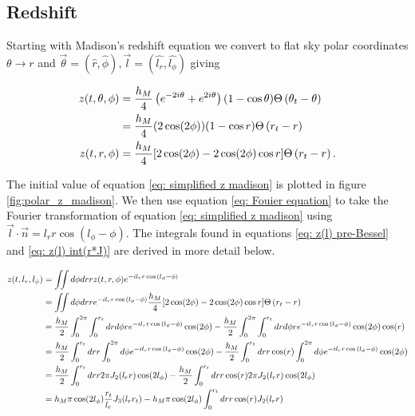 \documentclass{article}
\begin{document}
\subsection{Redshift}

Starting with Madison's redshift equation we convert to flat sky polar coordinates $\theta \rightarrow r$ and $\vec{\theta} = (\hat{r}, \hat{\phi}), \vec{l} = (\hat{l_r},  \hat{l_\phi})$ giving 

\begin{align}
    z(t, \theta, \phi) &= \frac{h_M}{4}\left(e^{-2 i \theta}+e^{2 i \theta}\right)(1-\cos \theta) \Theta\left(\theta_t-\theta\right) \notag \\
    &= \frac{h_M}{4}(2 \cos (2 \phi))(1-\cos r)\Theta\left(r_t-r\right) \notag \\
    z(t, r, \phi) &= \frac{h_M}{4}[2 \cos (2 \phi)-2 \cos (2 \phi) \cos r]\Theta\left(r_t-r\right). \label{eq: simplified z madison}
\end{align}

The initial value of equation \ref{eq: simplified z madison} is plotted in figure \ref{fig:polar_z_madison}. We then use equation \ref{eq: Fouier equation} to take the Fourier transformation of equation \ref{eq: simplified z madison} using $\vec{l} \cdot \vec{n} = l_rr\cos(l_\phi - \phi)$. The integrals found in equations \ref{eq: z(l) pre-Bessel} and \ref{eq: z(l) int(r*J)} are derived in more detail below. 

\begin{align}
    z(t, l_r, l_\phi) &= \iint d\phi dr r z(t, r, \phi) e^{-il_rr\cos{(l_\phi - \phi)}} \notag \\
    &= \iint d\phi dr r e^{-il_rr\cos{(l_\phi - \phi)}}\frac{h_M}{4}[2 \cos (2 \phi)-2 \cos (2 \phi) \cos r]\Theta\left(r_t-r\right) \notag \\
    &= \frac{h_M}{2} \int_0^{2\pi}\int_0^{r_t} dr d\phi r e^{-il_rr\cos{(l_\phi - \phi)}} \cos (2\phi)-\frac{h_M}{2} \int_0^{2\pi}\int_0^{r_t} dr d\phi r e^{-il_rr\cos{(l_\phi - \phi)}} \cos(2\phi)\cos(r) \notag \\
    &= \frac{h_M}{2} \int_0^{r_t} dr r \int_0^{2\pi}d\phi e^{-il_rr\cos{(l_\phi - \phi)}} \cos (2\phi)
    -\frac{h_M}{2} \int_0^{r_t} dr r \cos(r)\int_0^{2\pi} d\phi  e^{-il_rr\cos{(l_\phi - \phi)}} \cos(2\phi)  \label{eq: z(l) pre-Bessel}\\
    &= \frac{h_M}{2} \int_0^{r_t} dr r 2\pi J_2(l_rr)\cos(2l_\phi)-\frac{h_M}{2} \int_0^{r_t} dr r \cos(r)2\pi J_2(l_rr)\cos(2l_\phi)  \label{eq: z(l) int(r*J)}\\
    &= h_M \pi\cos(2l_\phi)\frac{r_t}{l_r}J_3(l_rr_t) - h_M\pi\cos(2l_\phi)\int_0^{r_t} dr r \cos(r)J_2(l_rr) \label{eq: z(l) final analytic}
\end{align}
\\
\end{document}
